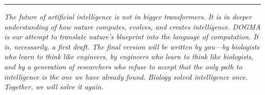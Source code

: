 \vspace{1.5em}

\begin{center}
\rule{0.5\textwidth}{0.4pt}
\end{center}

\vspace{1.5em}

\noindent
\textit{The future of artificial intelligence is not in bigger transformers. It is in deeper understanding of how nature computes, evolves, and creates intelligence. DOGMA is our attempt to translate nature's blueprint into the language of computation. It is, necessarily, a first draft. The final version will be written by you---by biologists who learn to think like engineers, by engineers who learn to think like biologists, and by a generation of researchers who refuse to accept that the only path to intelligence is the one we have already found. Biology solved intelligence once. Together, we will solve it again.}
